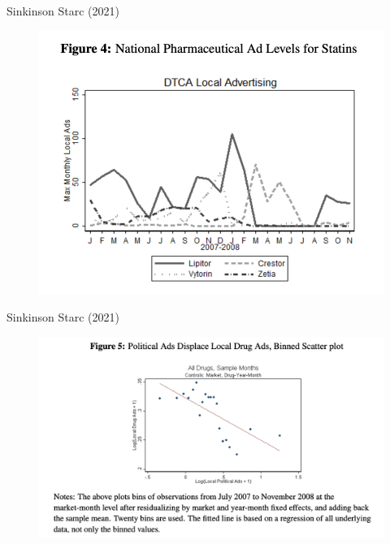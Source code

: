 \begin{frame}{Sinkinson Starc (2021)}
\begin{figure}
\centering
\includegraphics[height=\textheight]{./resources/ss_3.png}
\end{figure}
\end{frame}

\begin{frame}{Sinkinson Starc (2021)}
\begin{figure}
\centering
\includegraphics[height=\textheight]{./resources/ss_4.png}
\end{figure}
\end{frame}


